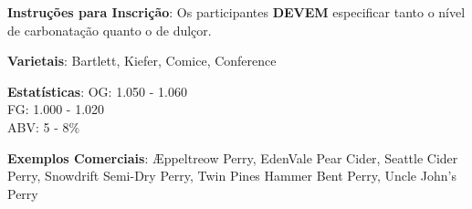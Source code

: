 \textbf{Instruções para Inscrição}: Os participantes \textbf{DEVEM} especificar tanto o nível de carbonatação quanto o de dulçor.

\textbf{Varietais}: Bartlett, Kiefer, Comice, Conference

\textbf{Estatísticas}: OG: 1.050 - 1.060 \\
\phantom{ } \hspace{16.5mm} FG: 1.000 - 1.020 \\
\phantom{ } \hspace{16.5mm} ABV: 5 - 8\%

\textbf{Exemplos Comerciais}: Æppeltreow Perry, EdenVale Pear Cider, Seattle Cider Perry, Snowdrift Semi-Dry Perry, Twin Pines Hammer Bent Perry, Uncle John's Perry